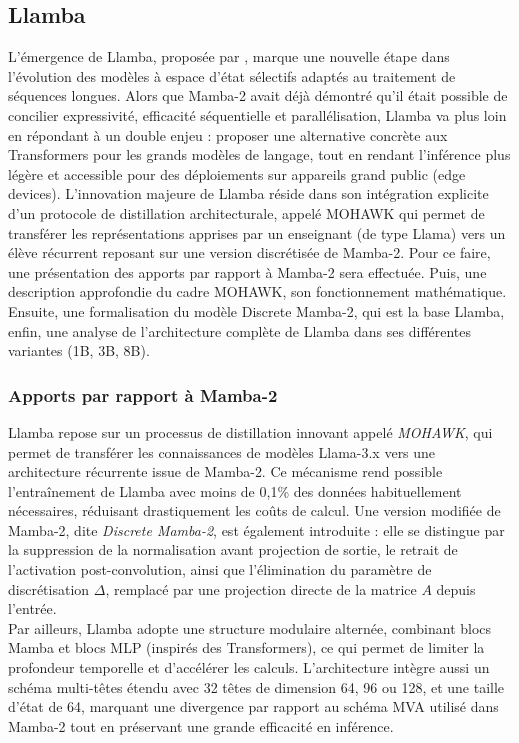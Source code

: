 \subsection{Llamba}

L’émergence de Llamba, proposée par \citep{bick2025llamba}, marque une nouvelle étape dans l’évolution des modèles à espace d’état sélectifs adaptés au traitement de séquences longues. Alors que Mamba-2 avait déjà démontré qu’il était possible de concilier expressivité, efficacité séquentielle et parallélisation, Llamba va plus loin en répondant à un double enjeu : proposer une alternative concrète aux Transformers pour les grands modèles de langage, tout en rendant l’inférence plus légère et accessible pour des déploiements sur appareils grand public (edge devices). L'innovation majeure de Llamba réside dans son intégration explicite d’un protocole de distillation architecturale, appelé MOHAWK qui permet de transférer les représentations apprises par un enseignant (de type Llama) vers un élève récurrent reposant sur une version discrétisée de Mamba-2. Pour ce faire, une présentation des apports par rapport à Mamba-2 sera effectuée. Puis, une description approfondie du cadre MOHAWK, son fonctionnement mathématique. Ensuite, une formalisation du modèle Discrete Mamba-2, qui est la base Llamba, enfin, une analyse de l’architecture complète de Llamba dans ses différentes variantes (1B, 3B, 8B).

\subsubsection{Apports par rapport à Mamba-2}

Llamba repose sur un processus de distillation innovant appelé \textit{MOHAWK}, qui permet de transférer les connaissances de modèles Llama-3.x vers une architecture récurrente issue de Mamba-2. Ce mécanisme rend possible l'entraînement de Llamba avec moins de 0{,}1\% des données habituellement nécessaires, réduisant drastiquement les coûts de calcul. Une version modifiée de Mamba-2, dite \textit{Discrete Mamba-2}, est également introduite : elle se distingue par la suppression de la normalisation avant projection de sortie, le retrait de l'activation post-convolution, ainsi que l’élimination du paramètre de discrétisation $\Delta$, remplacé par une projection directe de la matrice $A$ depuis l'entrée.\\

Par ailleurs, Llamba adopte une structure modulaire alternée, combinant blocs Mamba et blocs MLP (inspirés des Transformers), ce qui permet de limiter la profondeur temporelle et d’accélérer les calculs. L’architecture intègre aussi un schéma multi-têtes étendu avec 32 têtes de dimension 64, 96 ou 128, et une taille d’état de 64, marquant une divergence par rapport au schéma MVA utilisé dans Mamba-2 tout en préservant une grande efficacité en inférence.\\

